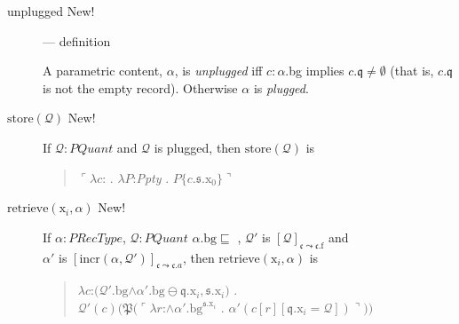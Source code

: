 \begin{description}
  \begin{description}
\item[unplugged New!] --- definition

  A parametric content, $\alpha$, is \textit{unplugged} iff $c:\alpha$.bg implies $c.\mathfrak{q}\not=\emptyset$
(that is, $c.\mathfrak{q}$ is not the empty record).  Otherwise $\alpha$
is \textit{plugged}.

\item[\textnormal{$\mathrm{store}(\mathcal{Q})$} New!] \mbox{}

  If $\mathcal{Q}:\textit{PQuant}$ and $\mathcal{Q}$ is plugged, then
$\mathrm{store}(\mathcal{Q})$ is
\begin{quote}
  $\ulcorner\lambda c$: . $\lambda
  P$:\textit{Ppty} . $P\{c.\mathfrak{s}.\text{x}_0\}\urcorner$
\end{quote}

\item[\textnormal{$\mathrm{retrieve}(\text{x}_i,\alpha)$} New!]
  \mbox{}

    If $\alpha:\textit{PRecType}$, $\mathcal{Q}:\textit{PQuant}$ 
  $\alpha.\text{bg}\sqsubseteq$ , $\mathcal{Q}'$ is
$[\mathcal{Q}]_{\mathfrak{c}\leadsto\mathfrak{c}.\text{f}}$ and\\
$\alpha'$ is
$[\mathrm{incr}(\alpha,\mathcal{Q}')]_{\mathfrak{c}\leadsto\mathfrak{c}.a}$, then
  $\mathrm{retrieve}(\text{x}_i,\alpha)$ is
  \begin{quote}
    $\lambda
    c$:$(\mathcal{Q}'.\text{bg}$\d{$\wedge$}$\alpha'.\text{bg}\ominus\mathfrak{q}.\text{x}_i,\mathfrak{s}.\text{x}_i)$
    . \\ \hspace*{2em}$\mathcal{Q'}(c)(\mathfrak{P}(\ulcorner\lambda
    r$:\d{$\wedge$}$\alpha'.\text{bg}^{\mathfrak{s}.\text{x}_i}$
    . $\alpha'(c[r][\mathfrak{q}.\text{x}_i=\mathcal{Q}])\urcorner))$
  \end{quote}




\end{description}
\end{description}
